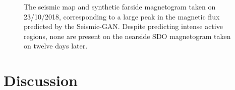 \documentclass[11pt,a4paper,onecolumn]{report}
\begin{document}
\begin{figure}[t]%
  \centering
  \caption[]{The seismic map  and synthetic farside
  magnetogram  taken on 23/10/2018, corresponding to a
  large peak in the magnetic flux predicted by the Seismic-GAN. Despite
  predicting intense active regions, none are present on the nearside SDO
  magnetogram  taken on twelve days later.}
  \label{fig:2018_peak}
\end{figure}



%
%
%
%
%
\chapter{Discussion}
\label{chap:discussion}
%
%
%
%
%
\end{document}
